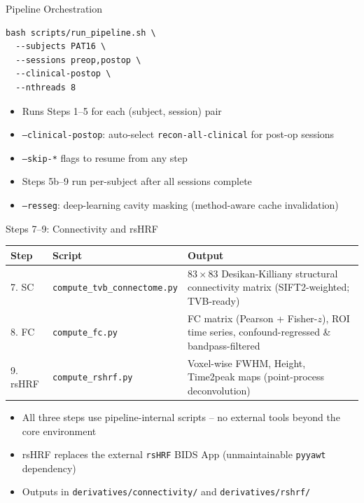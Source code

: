 \begin{frame}[fragile]{Pipeline Orchestration}

  \begin{lstlisting}
bash scripts/run_pipeline.sh \
  --subjects PAT16 \
  --sessions preop,postop \
  --clinical-postop \
  --nthreads 8
  \end{lstlisting}

  \bigskip

  \begin{itemize}
    \item Runs Steps 1--5 for each (subject, session) pair
    \item \texttt{--clinical-postop}: auto-select
      \texttt{recon-all-clinical} for post-op sessions
    \item \texttt{--skip-*} flags to resume from any step
    \item Steps 5b--9 run per-subject after all sessions complete
    \item \texttt{--resseg}: deep-learning cavity masking
      (method-aware cache invalidation)
  \end{itemize}

\end{frame}

\begin{frame}{Steps 7--9: Connectivity and rsHRF}

  \begin{tabular}{llp{5cm}}
    \toprule
    \textbf{Step} & \textbf{Script} & \textbf{Output} \\
    \midrule
    7. SC & \texttt{compute\_tvb\_connectome.py} &
      $83\times83$ Desikan-Killiany structural connectivity matrix
      (SIFT2-weighted; TVB-ready) \\
    8. FC & \texttt{compute\_fc.py} &
      FC matrix (Pearson + Fisher-$z$), ROI time series,
      confound-regressed \& bandpass-filtered \\
    9. rsHRF & \texttt{compute\_rshrf.py} &
      Voxel-wise FWHM, Height, Time2peak maps
      (point-process deconvolution) \\
    \bottomrule
  \end{tabular}

  \bigskip

  \begin{itemize}
    \item All three steps use pipeline-internal scripts --
      no external tools beyond the core environment
    \item rsHRF replaces the external \texttt{rsHRF} BIDS App
      (unmaintainable \texttt{pyyawt} dependency)
    \item Outputs in \texttt{derivatives/connectivity/} and
      \texttt{derivatives/rshrf/}
  \end{itemize}

\end{frame}

